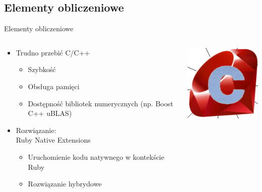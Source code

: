 \documentclass[12pt]{beamer}
\begin{document}
\subsection{Elementy obliczeniowe}
\begin{frame}{Elementy obliczeniowe}

\begin{columns}[T]
    \begin{column}{.7\textwidth}
\begin{itemize}
\item Trudno przebić C/C++
\begin{itemize}
	\item Szybkość
	\item Obsługa pamięci
	\item Dostępność bibliotek numerycznych (np. Boost C++ uBLAS)
\end{itemize}
\item Rozwiązanie: \\Ruby Native Extensions
\begin{itemize}
	\item Uruchomienie kodu natywnego w kontekście Ruby
	\item Rozwiązanie hybrydowe
\end{itemize}
\end{itemize}
    
 \end{column}
    \begin{column}{.3\textwidth}
    \begin{center}
\includegraphics[scale=0.3]{ruby_c}
\end{center}
 \end{column}
 \end{columns}
\end{frame}
\end{document}
